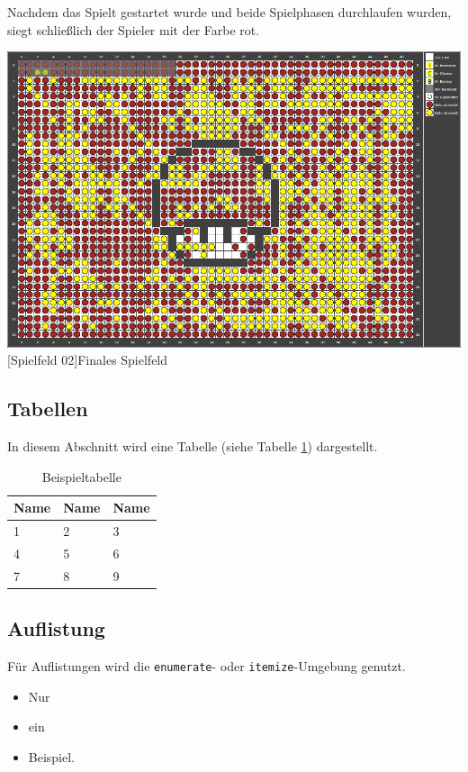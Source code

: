 \documentclass[12pt,a4paper,bibliography=totocnumbered,listof=totocnumbered]{article}
\begin{document}
Nachdem das Spielt gestartet wurde und beide Spielphasen durchlaufen wurden, siegt schließlich der Spieler mit der Farbe rot.

\vspace{1em}
\begin{minipage}{\linewidth}
	\centering
	\includegraphics[width=0.5\linewidth]{pics/gamefield02.png}
	[Spielfeld 02]{Finales Spielfeld\footnotemark }
	\label{fig:reversi2}
\end{minipage}

\subsection{Tabellen}
In diesem Abschnitt wird eine Tabelle (siehe Tabelle \ref{tab:beispiel}) dargestellt.

\vspace{1em}
\begin{table}[!h]
	\centering
	\begin{tabular}{|l|l|l|}
		\hline
		\textbf{Name} & \textbf{Name} & \textbf{Name}\\
		\hline
		1 & 2 & 3\\
		\hline
		4 & 5 & 6\\
		\hline
		7 & 8 & 9\\
		\hline
	\end{tabular}
	\caption{Beispieltabelle}
	\label{tab:beispiel}
\end{table}


\subsection{Auflistung}
Für Auflistungen wird die \texttt{enumerate}- oder \texttt{itemize}-Umgebung genutzt.

\begin{itemize}
	\item Nur
	\item ein
	\item Beispiel.
\end{itemize}
\end{document}
